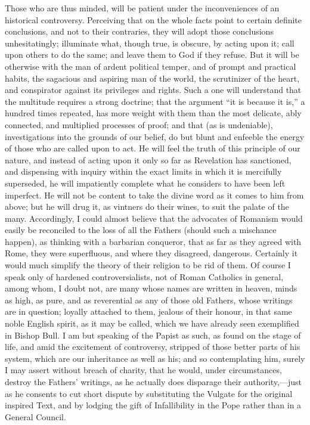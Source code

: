 Those who are thus minded, will be patient under the inconveniences
of an historical controversy. Perceiving that on the whole facts point
to certain definite conclusions, and not to their contraries, they
will adopt those conclusions unhesitatingly; illuminate what, though
true, is obscure, by acting upon it; call upon others to do the same;
and leave them to God if they refuse. But it will be otherwise with
the man of ardent political temper, and of prompt and practical
habits, the sagacious and aspiring man of the world, the scrutinizer
of the heart, and conspirator against its privileges and rights. Such
a one will understand that the multitude requires a strong doctrine;
that the argument ``it is because it is,'' a hundred times
repeated, has more weight with them than the most delicate, ably
connected, and multiplied processes of proof; and that (as is
undeniable), investigations into the grounds of our belief, do
but blunt and enfeeble the energy of those who are called upon to act.
He will feel the truth of this principle of our nature, and instead of
acting upon it only so far as Revelation has sanctioned, and
dispensing with inquiry within the exact limits in which it is
mercifully superseded, he will impatiently complete what he considers
to have been left imperfect. He will not be content to take the divine
word as it comes to him from above; but he will drug it, as vintners
do their wines, to suit the palate of the many. Accordingly, I could
almost believe that the advocates of Romanism would easily be
reconciled to the loss of all the Fathers (should such a mischance
happen), as thinking with a barbarian conqueror, that as far as they
agreed with Rome, they were superfluous, and where they disagreed,
dangerous. Certainly it would much simplify the theory of their
religion to be rid of them. Of course I speak only of hardened
controversialists, not of Roman Catholics in general, among whom, I
doubt not, are many whose names are written in heaven, minds as high,
as pure, and as reverential as any of those old Fathers, whose
writings are in question; loyally attached to them, jealous of their
honour, in that same noble English spirit, as it may be called, which
we have already seen exemplified in Bishop Bull. I am but speaking of
the Papist as such, as found on the stage of life, and amid the
excitement of controversy, stripped of those better parts of his
system, which are our inheritance as well as his; and so contemplating
him, surely I may assert without breach of charity, that he would,
under circumstances, destroy the Fathers' writings, as he actually
does disparage their authority,—just as he consents to cut short
dispute by substituting the Vulgate for the original inspired Text,
and by lodging the gift of Infallibility in the Pope rather than in a
General Council.


